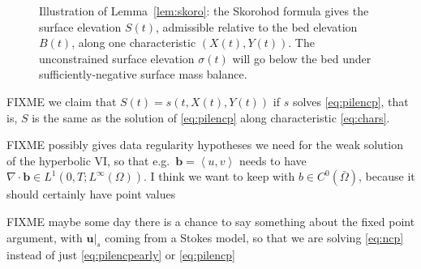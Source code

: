 \documentclass[hidelinks,onefignum,onetabnum,final]{siamart220329}  %
\newcommand{\bb}{\mathbf{b}}
\newcommand{\bu}{\mathbf{u}}
\newcommand{\Div}{\nabla\cdot}
\newcommand{\ip}[2]{\left<#1,#2\right>}
\begin{document}
\begin{figure}[ht]
\caption{Illustration of Lemma~\ref{lem:skoro}: the Skorohod formula gives the surface elevation $S(t)$, admissible relative to the bed elevation $B(t)$, along one characteristic $(X(t),Y(t))$.  The unconstrained surface elevation $\sigma(t)$ will go below the bed under sufficiently-negative surface mass balance.}
\label{fig:skoro}
\end{figure}

FIXME we claim that $S(t)=s(t,X(t),Y(t))$ if $s$ solves \eqref{eq:pilencp}, that is, $S$ is the same as the solution of \eqref{eq:pilencp} along characteristic \eqref{eq:chars}.

FIXME \cite{DiPernaLions1989} possibly gives data regularity hypotheses we need for the weak solution of the hyperbolic VI, so that e.g.~$\bb=\ip{u}{v}$ needs to have $\Div \bb \in L^1(0,T;L^\infty(\Omega))$.  I think we want to keep with $b\in C^0(\bar \Omega)$, because it should certainly have point values

FIXME maybe some day there is a chance to say something about the fixed point argument, with $\bu|_s$ coming from a Stokes model, so that we are solving \eqref{eq:ncp} instead of just \eqref{eq:pilencpearly} or \eqref{eq:pilencp}



\end{document}
